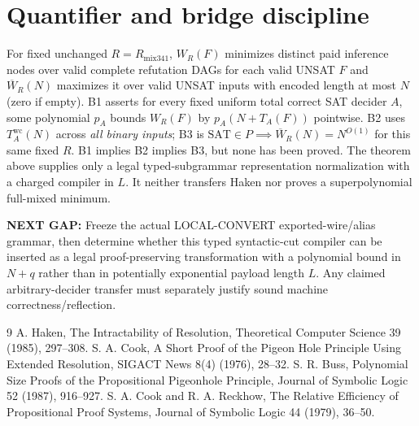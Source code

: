 \documentclass[11pt]{article}
\begin{document}
\section*{Quantifier and bridge discipline}
\noindent For fixed unchanged $R=R_{\mathrm{mix341}}$, $W_R(F)$ minimizes distinct paid inference nodes over valid complete refutation DAGs for each valid UNSAT $F$ and $\overline W_R(N)$ maximizes it over valid UNSAT inputs with encoded length at most $N$ (zero if empty). B1 asserts for every fixed uniform total correct SAT decider $A$, some polynomial $p_A$ bounds $W_R(F)$ by $p_A(N+T_A(F))$ pointwise. B2 uses $T_A^{\mathrm{wc}}(N)$ across \emph{all binary inputs}; B3 is $\mathrm{SAT}\in P\implies\overline W_R(N)=N^{O(1)}$ for this same fixed $R$. B1 implies B2 implies B3, but none has been proved. The theorem above supplies only a legal typed-subgrammar representation normalization with a charged compiler in $L$. It neither transfers Haken nor proves a superpolynomial full-mixed minimum.

\noindent\textbf{NEXT GAP:} Freeze the actual LOCAL-CONVERT exported-wire/alias grammar, then determine whether this typed syntactic-cut compiler can be inserted as a legal proof-preserving transformation with a polynomial bound in $N+q$ rather than in potentially exponential payload length $L$. Any claimed arbitrary-decider transfer must separately justify sound machine correctness/reflection.

\begin{thebibliography}{9}
 A. Haken, The Intractability of Resolution, Theoretical Computer Science 39 (1985), 297--308.
 S. A. Cook, A Short Proof of the Pigeon Hole Principle Using Extended Resolution, SIGACT News 8(4) (1976), 28--32.
 S. R. Buss, Polynomial Size Proofs of the Propositional Pigeonhole Principle, Journal of Symbolic Logic 52 (1987), 916--927.
 S. A. Cook and R. A. Reckhow, The Relative Efficiency of Propositional Proof Systems, Journal of Symbolic Logic 44 (1979), 36--50.
\end{thebibliography}
\end{document}
